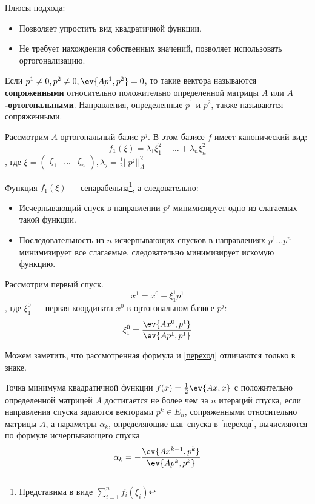 Плюсы подхода:
\begin{itemize}
    \item Позволяет упростить вид квадратичной функции.
    \item Не требует нахождения собственных значений, позволяет использовать ортогонализацию.
\end{itemize}

\begin{definition}
    Если \(p^1 \neq 0, p^2 \neq 0, \ev{Ap^1, p^2} = 0\), то такие вектора называются \textbf{сопряженными} относительно положительно определенной матрицы \(A\) или  \textbf{\(A\)-ортогональными}. Направления, определенные \(p^1\) и \(p^2\), также называются сопряженными.
\end{definition}

Рассмотрим \(A\)-ортогональный базис \(p^j\). В этом базисе \(f\) имеет канонический вид:
\[f_1(\xi) = \lambda_1 \xi_1^2  + \dots + \lambda_n \xi_n^2\]
, где \(\xi = \begin{pmatrix} \xi_1 & \dots & \xi_n \end{pmatrix}, \lambda_j = \frac{1}{2} ||p^j||^2_A\)

Функция \(f_1(\xi)\) --- сепарабельна\footnote{Представима в виде \(\sum_{i = 1}^n f_i(\xi_i)\)}, а следовательно:
\begin{itemize}
    \item Исчерпывающий спуск в направлении \(p^j\) минимизирует одно из слагаемых такой функции.
    \item Последовательность из \(n\) исчерпывающих спусков в направлениях \(p^1 \dots p^n\) минимизирует все слагаемые, следовательно минимизирует искомую функцию.
\end{itemize}

Рассмотрим первый спуск.
\[x^1 = x^0 - \xi_1^1 p^1\]
, где \(\xi_1^0\) --- первая координата \(x^0\) в ортогональном базисе \(p^j\):
\[\xi_1^0 = \frac{\ev{Ax^0, p^1}}{\ev{Ap^1, p^1}}\]

Можем заметить, что рассмотренная формула и \eqref{переход} отличаются только в знаке.

\begin{theorem}
    Точка минимума квадратичной функции \(f(x) = \frac{1}{2} \ev{Ax, x}\) с положительно определенной матрицей \(A\) достигается не более чем за \(n\) итераций спуска, если направления спуска задаются векторами \(p^k \in E_n\), сопряженными относительно матрицы \(A\), а параметры \(\alpha_k\), определяющие шаг спуска в \eqref{переход}, вычисляются по формуле исчерпывающего спуска
    \begin{equation}
        \alpha_k = - \frac{\ev{A x^{k - 1}, p^k}}{\ev{A p^k, p^k}}
        \label{формула исчерпывающего спуска}
    \end{equation}
\end{theorem}

